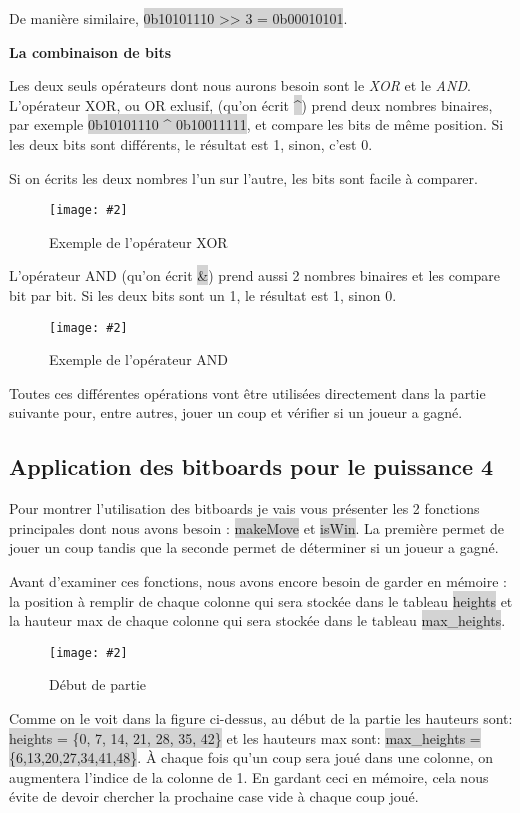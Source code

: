 \documentclass[a4paper]{article}
\newcommand{\img}[3][]{
    \begin{figure}[H]
        \centering
        \texttt{[image: \#2]}
        \caption{#1}    
    \end{figure}
}
\newcommand{\inlinecode}[1]{\colorbox{lightgray}{#1}}
\newcommand{\ptitle}[1]{\vspace{10pt}
{\large \noindent \textbf{#1}}}
\begin{document}
    De manière similaire, \inlinecode{0b10101110 >> 3 = 0b00010101}.

    
    \ptitle{La combinaison de bits}

    Les deux seuls opérateurs dont nous aurons besoin sont le \textit{XOR} et le \textit{AND}. L'opérateur XOR, ou OR exlusif, (qu'on écrit \inlinecode{\^{}}) prend deux nombres binaires, par exemple \inlinecode{0b10101110 \^{} 0b10011111}, et compare les bits de même position. Si les deux bits sont différents, le résultat est 1, sinon, c'est 0.

    Si on écrits les deux nombres l'un sur l'autre, les bits sont facile à comparer.
    \img[Exemple de l'opérateur XOR]{Images/XORExemple.png}{0.15}

    L'opérateur AND (qu'on écrit \inlinecode{\&}) prend aussi 2 nombres binaires et les compare bit par bit. Si les deux bits sont un 1, le résultat est 1, sinon 0.
    \img[Exemple de l'opérateur AND]{Images/ANDExemple.png}{0.15}

    Toutes ces différentes opérations vont être utilisées directement dans la partie suivante pour, entre autres, jouer un coup et vérifier si un joueur a gagné.

\subsection{Application des bitboards pour le puissance 4}

    Pour montrer l'utilisation des bitboards je vais vous présenter les 2 fonctions principales dont nous avons besoin : \inlinecode{makeMove} et \inlinecode{isWin}. La première permet de jouer un coup tandis que la seconde permet de déterminer si un joueur a gagné.

    Avant d'examiner ces fonctions, nous avons encore besoin de garder en mémoire : la position à remplir de chaque colonne qui sera stockée dans le tableau \inlinecode{heights} et la hauteur max de chaque colonne qui sera stockée dans le tableau \inlinecode{max\_heights}.

    \img[Début de partie]{Images/EmptyBoard.png}{0.4}

    Comme on le voit dans la figure ci-dessus, au début de la partie les hauteurs sont: \newline\inlinecode{heights = \{0, 7, 14, 21, 28, 35, 42\}} et les hauteurs max sont: \inlinecode{max\_heights = \{6,13,20,27,34,41,48\}}. À chaque fois qu'un coup sera joué dans une colonne, on augmentera l'indice de la colonne de 1. En gardant ceci en mémoire, cela nous évite de devoir chercher la prochaine case vide à chaque coup joué.
\end{document}
